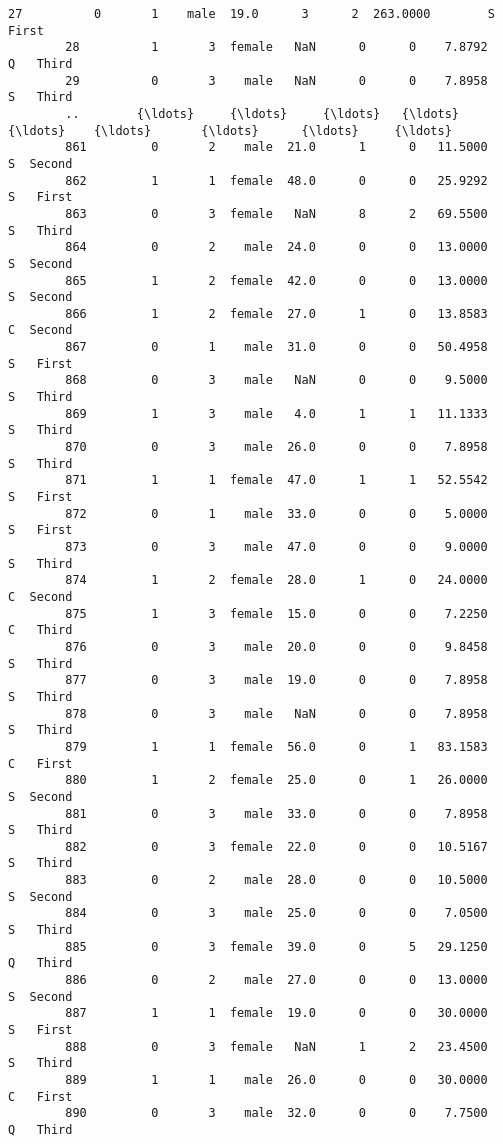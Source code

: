 \documentclass[11pt]{article}
\begin{document}
\begin{Verbatim}[commandchars=\\\{\}]
        27          0       1    male  19.0      3      2  263.0000        S   First   
        28          1       3  female   NaN      0      0    7.8792        Q   Third   
        29          0       3    male   NaN      0      0    7.8958        S   Third   
        ..        {\ldots}     {\ldots}     {\ldots}   {\ldots}    {\ldots}    {\ldots}       {\ldots}      {\ldots}     {\ldots}   
        861         0       2    male  21.0      1      0   11.5000        S  Second   
        862         1       1  female  48.0      0      0   25.9292        S   First   
        863         0       3  female   NaN      8      2   69.5500        S   Third   
        864         0       2    male  24.0      0      0   13.0000        S  Second   
        865         1       2  female  42.0      0      0   13.0000        S  Second   
        866         1       2  female  27.0      1      0   13.8583        C  Second   
        867         0       1    male  31.0      0      0   50.4958        S   First   
        868         0       3    male   NaN      0      0    9.5000        S   Third   
        869         1       3    male   4.0      1      1   11.1333        S   Third   
        870         0       3    male  26.0      0      0    7.8958        S   Third   
        871         1       1  female  47.0      1      1   52.5542        S   First   
        872         0       1    male  33.0      0      0    5.0000        S   First   
        873         0       3    male  47.0      0      0    9.0000        S   Third   
        874         1       2  female  28.0      1      0   24.0000        C  Second   
        875         1       3  female  15.0      0      0    7.2250        C   Third   
        876         0       3    male  20.0      0      0    9.8458        S   Third   
        877         0       3    male  19.0      0      0    7.8958        S   Third   
        878         0       3    male   NaN      0      0    7.8958        S   Third   
        879         1       1  female  56.0      0      1   83.1583        C   First   
        880         1       2  female  25.0      0      1   26.0000        S  Second   
        881         0       3    male  33.0      0      0    7.8958        S   Third   
        882         0       3  female  22.0      0      0   10.5167        S   Third   
        883         0       2    male  28.0      0      0   10.5000        S  Second   
        884         0       3    male  25.0      0      0    7.0500        S   Third   
        885         0       3  female  39.0      0      5   29.1250        Q   Third   
        886         0       2    male  27.0      0      0   13.0000        S  Second   
        887         1       1  female  19.0      0      0   30.0000        S   First   
        888         0       3  female   NaN      1      2   23.4500        S   Third   
        889         1       1    male  26.0      0      0   30.0000        C   First   
        890         0       3    male  32.0      0      0    7.7500        Q   Third   
        

\end{Verbatim}
\end{document}
